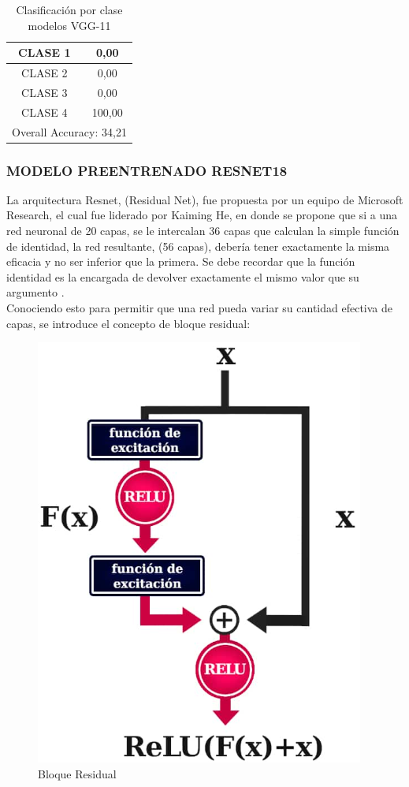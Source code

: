\begin{table}[ht]
	\centering
	\begin{tabular}{|c|c|}
		\hline
		CLASE 1 & 0,00 \bigstrut\\
		\hline
		CLASE 2 & 0,00 \bigstrut\\
		\hline
		CLASE 3 & 0,00 \bigstrut\\
		\hline
		CLASE 4 & 100,00 \bigstrut\\
		\hline
		\multicolumn{2}{|c|}{Overall Accuracy: 34,21} \bigstrut\\
		\hline
	\end{tabular}%
	\caption{Clasificación por clase modelos VGG-11}
	\label{fig:clase_VGG11}
\end{table}%


\newpage
\subsubsection{\MakeUppercase{Modelo preentrenado RESNET18}}
La arquitectura Resnet, (Residual Net), fue propuesta por un equipo de Microsoft Research, el cual fue liderado por Kaiming He, en donde se propone que si a una red neuronal de 20 capas, se le intercalan 36 capas que calculan la simple función de identidad, la red resultante, (56 capas), debería tener exactamente la misma eficacia y no ser inferior que la primera. Se debe recordar que la función identidad es la encargada de devolver exactamente el mismo valor que su argumento \cite{ref_4}.\\

Conociendo esto para permitir que una red pueda variar su cantidad efectiva de capas, se introduce el concepto de bloque residual:

\begin{figure}[ht]
	\centering
	\includegraphics[scale=0.6]{Figs/67.png}
	\caption{Bloque Residual}
	\label{fig:Bloque}
\end{figure}

